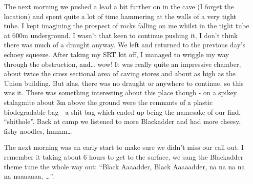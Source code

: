 The next morning we pushed a lead a bit further on in the cave (I forget the location) and spent quite a lot of time hammering at the walls of a very tight tube. I kept imagining the prospect of rocks falling on me whilst in the tight tube at 600m underground. I wasn’t that keen to continue pushing it, I don’t think there was much of a draught anyway. We left and returned to the previous day’s echoey squeeze. After taking my SRT kit off, I managed to wriggle my way through the obstruction, and… wow! It was really quite an impressive chamber, about twice the cross sectional area of caving stores and about as high as the Union building. But alas, there was no draught or anywhere to continue, so this was it. There was something interesting about this place though - on a spikey stalagmite about 3m above the ground were the remnants of a plastic biodegradable bag - a shit bag which ended up being the namesake of our find, “shithole”. Back at camp we listened to more Blackadder and had more cheesy, fishy noodles, hmmm…

The next morning was an early start to make sure we didn’t miss our call out. I remember it taking about 6 hours to get to the surface, we sang the Blackadder theme tune the whole way out: “Black Aaaadder, Black Aaaaadder, na na na na na naaaaaaa, …”.

